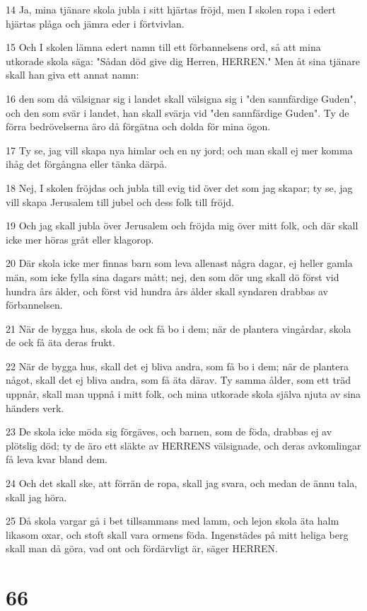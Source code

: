 \par 14 Ja, mina tjänare skola jubla i sitt hjärtas fröjd, men I skolen ropa i edert hjärtas plåga och jämra eder i förtvivlan.
\par 15 Och I skolen lämna edert namn till ett förbannelsens ord, så att mina utkorade skola säga: "Sådan död give dig Herren, HERREN." Men åt sina tjänare skall han giva ett annat namn:
\par 16 den som då välsignar sig i landet skall välsigna sig i "den sannfärdige Guden", och den som svär i landet, han skall svärja vid "den sannfärdige Guden". Ty de förra bedrövelserna äro då förgätna och dolda för mina ögon.
\par 17 Ty se, jag vill skapa nya himlar och en ny jord; och man skall ej mer komma ihåg det förgångna eller tänka därpå.
\par 18 Nej, I skolen fröjdas och jubla till evig tid över det som jag skapar; ty se, jag vill skapa Jerusalem till jubel och dess folk till fröjd.
\par 19 Och jag skall jubla över Jerusalem och fröjda mig över mitt folk, och där skall icke mer höras gråt eller klagorop.
\par 20 Där skola icke mer finnas barn som leva allenast några dagar, ej heller gamla män, som icke fylla sina dagars mått; nej, den som dör ung skall dö först vid hundra års ålder, och först vid hundra års ålder skall syndaren drabbas av förbannelsen.
\par 21 När de bygga hus, skola de ock få bo i dem; när de plantera vingårdar, skola de ock få äta deras frukt.
\par 22 När de bygga hus, skall det ej bliva andra, som få bo i dem; när de plantera något, skall det ej bliva andra, som få äta därav. Ty samma ålder, som ett träd uppnår, skall man uppnå i mitt folk, och mina utkorade skola själva njuta av sina händers verk.
\par 23 De skola icke möda sig förgäves, och barnen, som de föda, drabbas ej av plötslig död; ty de äro ett släkte av HERRENS välsignade, och deras avkomlingar få leva kvar bland dem.
\par 24 Och det skall ske, att förrän de ropa, skall jag svara, och medan de ännu tala, skall jag höra.
\par 25 Då skola vargar gå i bet tillsammans med lamm, och lejon skola äta halm likasom oxar, och stoft skall vara ormens föda. Ingenstädes på mitt heliga berg skall man då göra, vad ont och fördärvligt är, säger HERREN.

\chapter{66}

